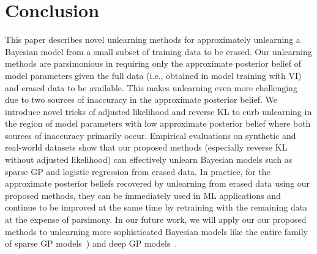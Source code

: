 \documentclass{article}
\theoremstyle{definition}
\begin{document}
\section{Conclusion}
\label{sec:conclusion}%
%
This paper describes novel  unlearning methods for approximately unlearning a Bayesian model from a small subset of training data to be erased. Our unlearning methods are parsimonious in requiring only the approximate posterior belief of model parameters given the full data (i.e., obtained in model training with VI) and erased data to be available. This makes unlearning even more challenging due to two sources of inaccuracy in the approximate posterior belief.
We introduce novel tricks of adjusted likelihood and reverse KL to curb unlearning in the region of model parameters with low approximate posterior belief where both sources of inaccuracy primarily occur.
Empirical evaluations on synthetic and real-world datasets show that our proposed methods (especially reverse KL without adjusted likelihood) can effectively unlearn Bayesian models such as sparse GP and logistic regression from erased data.
In practice, for the approximate posterior beliefs recovered by unlearning from erased data using our proposed methods, they can be immediately used in ML applications and continue to be improved at the same time
by retraining with the remaining data at the expense of parsimony.
In our future work, we will apply our our proposed methods to unlearning more sophisticated Bayesian models like the entire family of sparse GP models~\cite{Chen13,LowTASE15,LowRSS13,LowUAI12,MinhAAAI17,HoangICML19,hoang2015unifying,HoangICML16,NghiaAAAI19,LowECML14a,low15,Ruofei18,teng20,LowAAAI14,HaibinAPP}) and deep GP models~\cite{yu19}.
\end{document}
